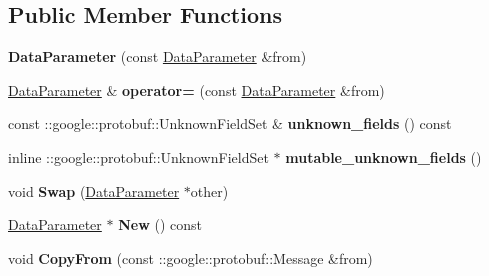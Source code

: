 \subsection*{Public Member Functions}
\begin{DoxyCompactItemize}
\item 
\mbox{\label{classcaffe_1_1_data_parameter_a94a77bfe3167a401d7fe18120a29b22e}} 
{\bfseries Data\+Parameter} (const \mbox{\hyperlink{classcaffe_1_1_data_parameter}{Data\+Parameter}} \&from)
\item 
\mbox{\label{classcaffe_1_1_data_parameter_ae35ae71a30890c05d54df31114ce6dac}} 
\mbox{\hyperlink{classcaffe_1_1_data_parameter}{Data\+Parameter}} \& {\bfseries operator=} (const \mbox{\hyperlink{classcaffe_1_1_data_parameter}{Data\+Parameter}} \&from)
\item 
\mbox{\label{classcaffe_1_1_data_parameter_a0f8ec5baa77c46068d54660d2f438d53}} 
const \+::google\+::protobuf\+::\+Unknown\+Field\+Set \& {\bfseries unknown\+\_\+fields} () const
\item 
\mbox{\label{classcaffe_1_1_data_parameter_a558abee56269b3cb1459256ac41db74a}} 
inline \+::google\+::protobuf\+::\+Unknown\+Field\+Set $\ast$ {\bfseries mutable\+\_\+unknown\+\_\+fields} ()
\item 
\mbox{\label{classcaffe_1_1_data_parameter_a1aba7f6a57af76284341e0358e05b6b3}} 
void {\bfseries Swap} (\mbox{\hyperlink{classcaffe_1_1_data_parameter}{Data\+Parameter}} $\ast$other)
\item 
\mbox{\label{classcaffe_1_1_data_parameter_a4582bc1f62703a78b839b2e59c0c0faf}} 
\mbox{\hyperlink{classcaffe_1_1_data_parameter}{Data\+Parameter}} $\ast$ {\bfseries New} () const
\item 
\mbox{\label{classcaffe_1_1_data_parameter_aae53dd492f5048afdcfe6a4743683627}} 
void {\bfseries Copy\+From} (const \+::google\+::protobuf\+::\+Message \&from)
\item 
\mbox{\label{classcaffe_1_1_data_parameter_a93f65d13391d7be7c518c0fe0043477d}} 

\end{DoxyCompactItemize}
